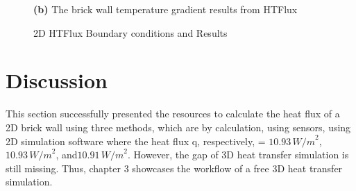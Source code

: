 \begin{figure}[tbh]
\begin{minipage}{0.45\textwidth}
  \caption*{\textbf{(b)} The brick wall temperature gradient results from HTFlux}
\end{minipage}
\caption{2D HTFlux Boundary conditions and Results}
\label{2dconst}
\end{figure}


\section{Discussion}
This section successfully presented the resources to calculate the heat flux of a 2D brick wall using three methods, which are by calculation, using sensors, using 2D simulation software where the heat flux q, respectively, = \( 10.93 \, {W/m}^2 \), \( 10.93 \, {W/m}^2 \), and\( 10.91 \, {W/m}^2 \). However, the gap of 3D heat transfer simulation is still missing. Thus, chapter 3 showcases the workflow of a free 3D heat transfer simulation.